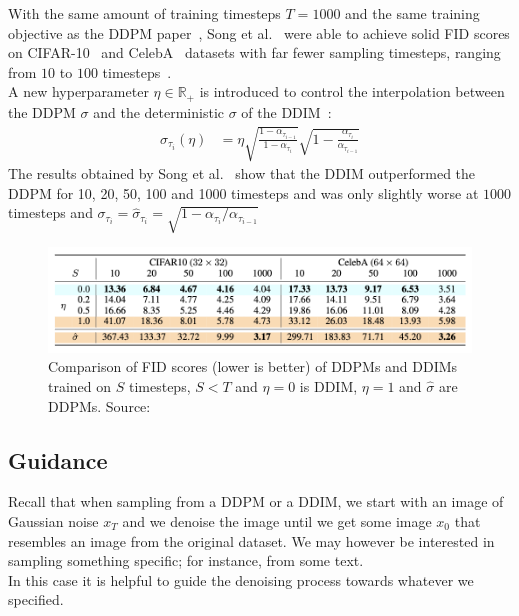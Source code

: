 \documentclass{article}
\numberwithin{equation}{section}
\numberwithin{figure}{section}
\begin{document}
With the same amount of training timesteps $T = 1000$ and the same training objective as the DDPM paper~\cite{ho2020denoising}, Song et al.~\cite{song2022denoising} were able to achieve solid FID scores on CIFAR-10~\cite{cifar10} and CelebA~\cite{liu2015faceattributes} datasets with far fewer sampling timesteps, ranging from $10$ to $100$ timesteps~\cite{song2022denoising}. \\
A new hyperparameter $\eta \in \mathbb{R}_+$ is introduced to control the interpolation between the DDPM $\sigma$ and the deterministic $\sigma$ of the DDIM~\cite{song2022denoising}:
\begin{align}
  \sigma_{\tau_i} (\eta) &= \eta \sqrt{\frac{1 - \alpha_{\tau_{i-1}}}{1 - \alpha_{\tau_i}}} \sqrt{1 - \frac{\alpha_{\tau_i}}{\alpha_{\tau_{i-1}}}}
\end{align}
The results obtained by Song et al.~\cite{song2022denoising} show that the DDIM outperformed the DDPM for 10, 20, 50, 100 and 1000 timesteps and was only slightly worse at $1000$ timesteps and $\sigma_{\tau_i} = \hat{\sigma}_{\tau_i} = \sqrt{1 - \alpha_{\tau_i} / \alpha_{\tau_{i-1}}}$

\begin{figure}[h]
  \begin{center}
    \includegraphics[width=\textwidth]{images/ddim_table.png}
    \caption{Comparison of FID scores (lower is better) of DDPMs and DDIMs trained on $S$ timesteps, $S < T$ and $\eta = 0$ is DDIM, $\eta = 1$ and $\hat{\sigma}$ are DDPMs. Source:~\cite{song2022denoising}}
  \end{center}
\end{figure}



\subsection{Guidance}
Recall that when sampling from a DDPM or a DDIM, we start with an image of Gaussian noise $x_T$ and we denoise the image until we get some image $x_0$ that resembles an image from the original dataset. We may however be interested in sampling something specific; for instance, from some text. \\
In this case it is helpful to guide the denoising process towards whatever we specified.
\end{document}
